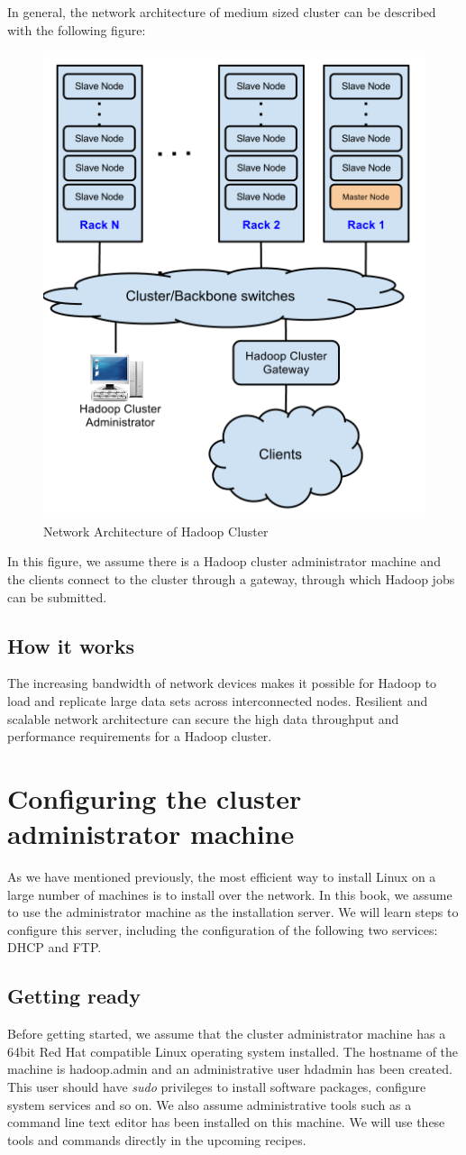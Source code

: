 In general, the network architecture of medium sized cluster can be described with the following figure:
\begin{figure}[ht]
  \centering
  \includegraphics[width=.6\textwidth]{figs/5163os_02_01.png}
  \caption{Network Architecture of Hadoop Cluster}\label{fig:network.architecture}
\end{figure} 
In this figure, we assume there is a Hadoop cluster administrator machine and the clients connect to the cluster through a gateway, through which Hadoop jobs can be submitted.
\subsection*{How it works}
The increasing bandwidth of network devices makes it possible for Hadoop to load and replicate large data sets across interconnected nodes. Resilient and scalable network architecture can secure the high data throughput and performance requirements for a Hadoop cluster.

\section{Configuring the cluster administrator machine}
As we have mentioned previously, the most efficient way to install Linux on a large number of machines is to install over the network. In this book, we assume to use the administrator machine as the installation server. We will learn steps to configure this server, including the configuration of the following two services: DHCP and FTP.

\subsection*{Getting ready}
Before getting started, we assume that the cluster administrator machine has a 64bit Red Hat compatible Linux operating system installed. The hostname of the machine is hadoop.admin and an administrative user hdadmin has been created. This user should have \emph{sudo} privileges to install software packages, configure system services and so on. We also assume administrative tools such as a command line text editor has been installed on this machine. We will use these tools and commands directly in the upcoming recipes.

